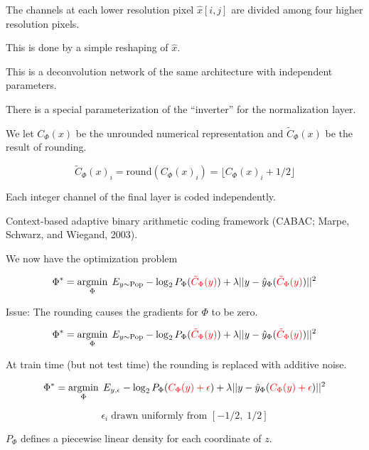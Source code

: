 {\vfill
The channels at each lower resolution pixel $\hat{x}[i,j]$ are divided among four higher resolution pixels.

\vfill
This is done by a simple reshaping of $\hat{x}$.



This is a deconvolution network of the same architecture with independent parameters.

\vfill
There is a special parameterization of the ``inverter'' for the normalization layer.


We let $C_\Phi(x)$ be the unrounded numerical representation and $\tilde{C}_\Phi(x)$ be the result of rounding.

\vfill
$$\tilde{C}_\Phi(x)_i =  \mathrm{round}(C_\Phi(x)_i) = \lfloor C_\Phi(x)_i + 1/2\rfloor$$

\vfill
Each integer channel of the final layer is coded independently.

\vfill
Context-based adaptive binary arithmetic coding framework (CABAC; Marpe, Schwarz, and Wiegand, 2003).


We now have the optimization problem

$$\Phi^* = \operatorname*{argmin}_\Phi\; E_{y \sim \mathrm{Pop}} - \log_2 P_\Phi({\color{red} \tilde{C}_\Phi(y)}) + \lambda ||y - \hat{y}_\Phi({\color{red} \tilde{C}_\Phi(y)})||^2$$

\vfill
Issue: The rounding causes the gradients for $\Phi$ to be zero.


$$\Phi^* = \operatorname*{argmin}_\Phi\; E_{y \sim \mathrm{Pop}} - \log_2 P_\Phi({\color{red} \tilde{C}_\Phi(y)}) + \lambda ||y - \hat{y}_\Phi({\color{red} \tilde{C}_\Phi(y)})||^2$$

\vfill
At train time (but not test time) the rounding is replaced with additive noise.

\vfill
$$\Phi^* = \operatorname*{argmin}_\Phi\; E_{y,\epsilon} - \log_2 P_\Phi({\color{red} C_\Phi(y) + \epsilon}) + \lambda ||y - \hat{y}_\Phi({\color{red} C_\Phi(y)+ \epsilon})||^2$$

\vfill
$$\epsilon_i \;\mbox{drawn uniformly from $[-1/2,\;1/2]$}$$

\vfill
$P_\Phi$ defines a piecewise linear density for each coordinate of $z$. 


}
